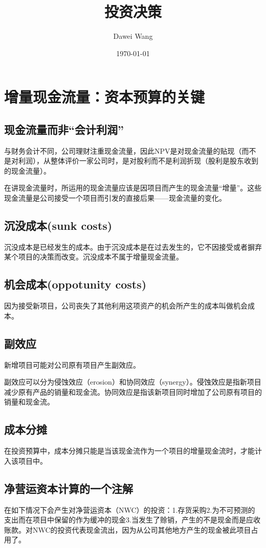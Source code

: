 \documentclass{article}
\title{投资决策}
\author{Dawei Wang}
\date{\today}
\begin{document}
	\maketitle
\section{增量现金流量：资本预算的关键}
\subsection{现金流量而非“会计利润”}
与财务会计不同，公司理财注重现金流量，因此NPV是对现金流量的贴现（而不是对利润），从整体评价一家公司时，是对股利而不是利润折现（股利是股东收到的现金流量）。

在讲现金流量时，所运用的现金流量应该是因项目而产生的现金流量“增量”。这些现金流量是公司接受一个项目而引发的直接后果——现金流量的变化。
\subsection{沉没成本(sunk costs)}
沉没成本是已经发生的成本。由于沉没成本是在过去发生的，它不因接受或者摒弃某个项目的决策而改变。沉没成本不属于增量现金流量。

\subsection{机会成本(oppotunity costs)}
因为接受新项目，公司丧失了其他利用这项资产的机会所产生的成本叫做机会成本。

\subsection{副效应}
新增项目可能对公司原有项目产生副效应。

副效应可以分为侵蚀效应（erosion）和协同效应（synergy）。侵蚀效应是指新项目减少原有产品的销量和现金流。协同效应是指该新项目同时增加了公司原有项目的销量和现金流。		

\subsection{成本分摊}
在投资预算中，成本分摊只能是当该现金流作为一个项目的增量现金流时，才能计入该项目中。

\subsection{净营运资本计算的一个注解}
在如下情况下会产生对净营运资本（NWC）的投资：1.存货采购2.为不可预测的支出而在项目中保留的作为缓冲的现金3.当发生了赊销，产生的不是现金而是应收账款。对NWC的投资代表现金流出，因为从公司其他地方产生的现金被此项目占用了。
\end{document}
